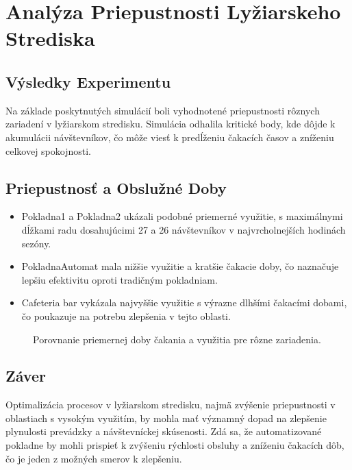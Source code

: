 ﻿

\section{Analýza Priepustnosti Lyžiarskeho Strediska}
\subsection{Výsledky Experimentu}

Na základe poskytnutých simulácií boli vyhodnotené priepustnosti rôznych zariadení v lyžiarskom stredisku.
Simulácia odhalila kritické body, kde dôjde k akumulácii návštevníkov, čo môže viesť k predĺženiu čakacích časov a zníženiu celkovej spokojnosti.

\subsection{Priepustnosť a Obslužné Doby}
\begin{itemize}
  \item Pokladna1 a Pokladna2 ukázali podobné priemerné využitie, s maximálnymi dĺžkami radu dosahujúcimi 27 a 26 návštevníkov v najvrcholnejších hodinách sezóny.
  \item PokladnaAutomat mala nižšie využitie a kratšie čakacie doby, čo naznačuje lepšiu efektivitu oproti tradičným pokladniam.
  \item Cafeteria bar vykázala najvyššie využitie s výrazne dlhšími čakacími dobami, čo poukazuje na potrebu zlepšenia v tejto oblasti.
\end{itemize}

\begin{figure}[h]
  \centering
  \caption{Porovnanie priemernej doby čakania a využitia pre rôzne zariadenia.}
\end{figure}

\subsection{Záver}
Optimalizácia procesov v lyžiarskom stredisku, najmä zvýšenie priepustnosti v oblastiach s vysokým využitím, by mohla mať významný dopad na zlepšenie plynulosti prevádzky a návštevníckej skúsenosti. Zdá sa, že automatizované pokladne by mohli prispieť k zvýšeniu rýchlosti obsluhy a zníženiu čakacích dôb, čo je jeden z možných smerov k zlepšeniu.



